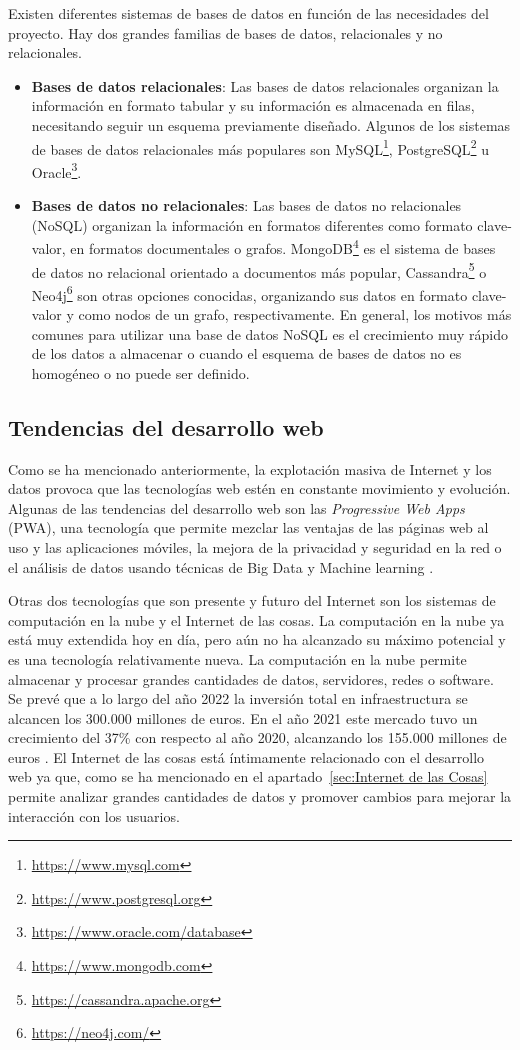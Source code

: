 \documentclass[a4paper, 12pt, oneside]{book}
\begin{document}
Existen diferentes sistemas de bases de datos en función de las necesidades del proyecto. Hay dos grandes familias de bases de datos, relacionales y no relacionales.

\begin{itemize}
\item \textbf{Bases de datos relacionales}: Las bases de datos relacionales organizan la información en formato tabular y su información es almacenada en filas, necesitando seguir un esquema previamente diseñado. Algunos de los sistemas de bases de datos relacionales más populares son MySQL\footnote{\url{https://www.mysql.com}}, PostgreSQL\footnote{\url{https://www.postgresql.org}} u Oracle\footnote{\url{https://www.oracle.com/database}}.

\item \textbf{Bases de datos no relacionales}: Las bases de datos no relacionales (NoSQL) organizan la información en formatos diferentes como formato clave-valor, en formatos documentales o grafos. MongoDB\footnote{\url{https://www.mongodb.com}} es el sistema de bases de datos no relacional orientado a documentos más popular, Cassandra\footnote{\url{https://cassandra.apache.org}} o Neo4j\footnote{\url{https://neo4j.com/}} son otras opciones conocidas, organizando sus datos en formato clave-valor y como nodos de un grafo, respectivamente. En general, los motivos más comunes para utilizar una base de datos NoSQL es el crecimiento muy rápido de los datos a almacenar o cuando el esquema de bases de datos no es homogéneo o no puede ser definido.
\end{itemize}

\subsection{Tendencias del desarrollo web}
\label{subsec: tendencias del desarrollo web}
Como se ha mencionado anteriormente, la explotación masiva de Internet y los datos provoca que las tecnologías web estén en constante movimiento y evolución. Algunas de las tendencias del desarrollo web son las \textit{Progressive Web Apps} (PWA), una tecnología que permite mezclar las ventajas de las páginas web al uso y las aplicaciones móviles, la mejora de la privacidad y seguridad en la red o el análisis de datos usando técnicas de Big Data y Machine learning \cite{pwa}. 

Otras dos tecnologías que son presente y futuro del Internet son los sistemas de computación en la nube y el Internet de las cosas. La computación en la nube ya está muy extendida hoy en día, pero aún no ha alcanzado su máximo potencial y es una tecnología relativamente nueva. La computación en la nube permite almacenar y procesar grandes cantidades de datos, servidores, redes o software. Se prevé que a lo largo del año 2022 la inversión total en infraestructura se alcancen los 300.000 millones de euros. En el año 2021 este mercado tuvo un crecimiento del 37\% con respecto al año 2020, alcanzando los 155.000 millones de euros \cite{nube}.
El Internet de las cosas está íntimamente relacionado con el desarrollo web ya que, como se ha mencionado en el apartado~\ref{sec:Internet de las Cosas} permite analizar grandes cantidades de datos y promover cambios para mejorar la interacción con los usuarios.
\end{document}
